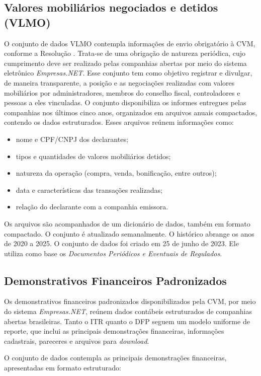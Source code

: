 \documentclass[recuosum=1.5cm]{iftex2024}
\begin{document}
\subsection{Valores mobiliários negociados e detidos (VLMO)}
O conjunto de dados VLMO contempla informações de envio obrigatório à CVM, conforme a Resolução \citet{cvm:2021:resolucao44}. Trata-se de uma obrigação de natureza periódica, cujo cumprimento deve ser realizado pelas companhias abertas por meio do sistema eletrônico \textit{Empresas.NET}. Esse conjunto tem como objetivo registrar e divulgar, de maneira transparente, a posição e as negociações realizadas com valores mobiliários por administradores, membros do conselho fiscal, controladores e pessoas a eles vinculadas. O conjunto disponibiliza os informes entregues pelas companhias nos últimos cinco anos, organizados em arquivos anuais compactados, contendo os dados estruturados. Esses arquivos reúnem informações como:

\begin{itemize}
	\item nome e CPF/CNPJ dos declarantes;
	\item tipos e quantidades de valores mobiliários detidos;
	\item natureza da operação (compra, venda, bonificação, entre outros);
	\item data e características das transações realizadas;
	\item relação do declarante com a companhia emissora.
\end{itemize}

Os arquivos são acompanhados de um dicionário de dados, também em formato compactado. O conjunto é atualizado semanalmente. O histórico abrange os anos de 2020 a 2025. O conjunto de dados foi criado em 25 de junho de 2023. Ele utiliza como base os \textit{Documentos Periódicos e Eventuais de Regulados}.

\subsection{Demonstrativos Financeiros Padronizados}
Os demonstrativos financeiros padronizados disponibilizados pela CVM, por meio do sistema \textit{Empresas.NET}, reúnem dados contábeis estruturados de companhias abertas brasileiras. Tanto o ITR quanto o DFP seguem um modelo uniforme de reporte, que inclui as principais demonstrações financeiras, informações cadastrais, pareceres e arquivos para \textit{download}.

O conjunto de dados contempla as principais demonstrações financeiras, apresentadas em formato estruturado:
\end{document}
